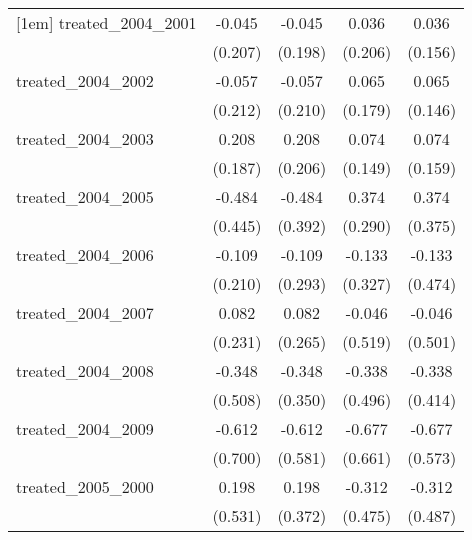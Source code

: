 {\begin{tabular}{l*{4}{c}}
[1em]
treated\_2004\_2001&      -0.045         &      -0.045         &       0.036         &       0.036         \\
            &     (0.207)         &     (0.198)         &     (0.206)         &     (0.156)         \\
[1em]
treated\_2004\_2002&      -0.057         &      -0.057         &       0.065         &       0.065         \\
            &     (0.212)         &     (0.210)         &     (0.179)         &     (0.146)         \\
[1em]
treated\_2004\_2003&       0.208         &       0.208         &       0.074         &       0.074         \\
            &     (0.187)         &     (0.206)         &     (0.149)         &     (0.159)         \\
[1em]
treated\_2004\_2005&      -0.484         &      -0.484         &       0.374         &       0.374         \\
            &     (0.445)         &     (0.392)         &     (0.290)         &     (0.375)         \\
[1em]
treated\_2004\_2006&      -0.109         &      -0.109         &      -0.133         &      -0.133         \\
            &     (0.210)         &     (0.293)         &     (0.327)         &     (0.474)         \\
[1em]
treated\_2004\_2007&       0.082         &       0.082         &      -0.046         &      -0.046         \\
            &     (0.231)         &     (0.265)         &     (0.519)         &     (0.501)         \\
[1em]
treated\_2004\_2008&      -0.348         &      -0.348         &      -0.338         &      -0.338         \\
            &     (0.508)         &     (0.350)         &     (0.496)         &     (0.414)         \\
[1em]
treated\_2004\_2009&      -0.612         &      -0.612         &      -0.677         &      -0.677         \\
            &     (0.700)         &     (0.581)         &     (0.661)         &     (0.573)         \\
[1em]
treated\_2005\_2000&       0.198         &       0.198         &      -0.312         &      -0.312         \\
            &     (0.531)         &     (0.372)         &     (0.475)         &     (0.487)         \\

\end{tabular}}
